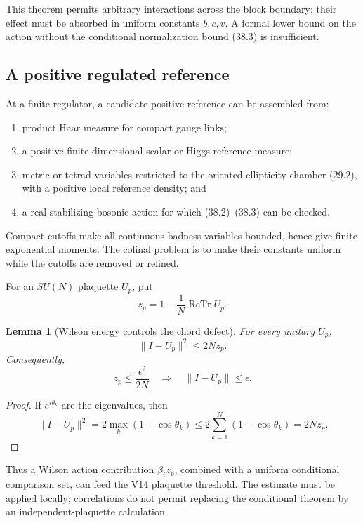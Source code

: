 \documentclass[11pt]{article}
\newtheorem{lemma}[theorem]{Lemma}
\begin{document}
This theorem permits arbitrary interactions across the block boundary;
their effect must be absorbed in uniform constants \(b,c,v\).  A formal
lower bound on the action without the conditional normalization bound
(38.3) is insufficient.

\subsection{A positive regulated reference}

At a finite regulator, a candidate positive reference can be assembled
from:
\begin{enumerate}[label=\textnormal{(\roman*)}]
\item product Haar measure for compact gauge links;
\item a positive finite-dimensional scalar or Higgs reference measure;
\item metric or tetrad variables restricted to the oriented ellipticity
chamber (29.2), with a positive local reference density; and
\item a real stabilizing bosonic action for which (38.2)--(38.3) can be
checked.
\end{enumerate}
Compact cutoffs make all continuous badness variables bounded, hence
give finite exponential moments.  The cofinal problem is to make their
constants uniform while the cutoffs are removed or refined.

For an \(SU(N)\) plaquette \(U_p\), put
\[
 z_p=1-\frac1N\operatorname{ReTr}U_p.
 \tag{38.7}
\]

\begin{lemma}[Wilson energy controls the chord defect]
\label{lem:v11v38-wilson-chord}
For every unitary \(U_p\),
\[
 \|I-U_p\|^2\leq2N z_p.
 \tag{38.8}
\]
Consequently,
\[
 z_p\leq\frac{\epsilon^2}{2N}
 \quad\Longrightarrow\quad
 \|I-U_p\|\leq\epsilon.
 \tag{38.9}
\]
\end{lemma}

\begin{proof}
If \(e^{i\theta_k}\) are the eigenvalues, then
\[
 \|I-U_p\|^2
 =
 2\max_k(1-\cos\theta_k)
 \leq
 2\sum_{k=1}^N(1-\cos\theta_k)
 =2Nz_p.
\]
\end{proof}

Thus a Wilson action contribution \(\beta_i z_p\), combined with a
uniform conditional comparison set, can feed the V14 plaquette
threshold.  The estimate must be applied locally; correlations do not
permit replacing the conditional theorem by an independent-plaquette
calculation.
\end{document}
